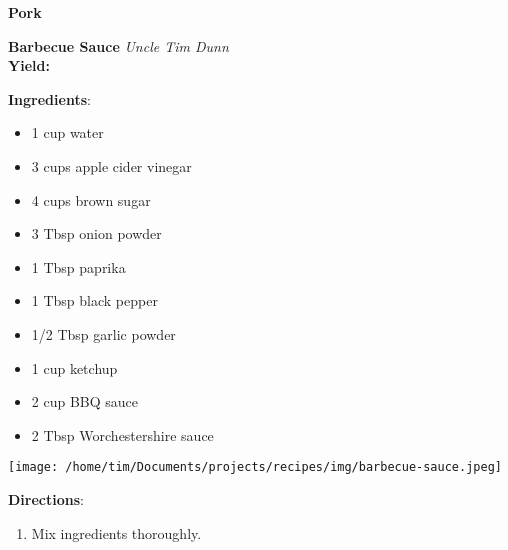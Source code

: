 \documentclass[11pt, twoside, openany]{book}
\begin{document}
{\newpage \LARGE \textbf{Pork}} \label{pork}\\
\noindent\begin{minipage}[t]{\linewidth}%
{\Large\textbf{Barbecue Sauce}} \label{barbecue-sauce}\hfill\textit{Uncle Tim Dunn}\\
\textbf{Yield:} \textit{}\\
\noindent\begin{minipage}[t]{0.78\linewidth}%
\textbf{Ingredients}:\vspace{-3mm}
\begin{multicols}{2}
\begin{itemize}\setlength\itemsep{-1mm}
\item 1 cup water
\item 3 cups apple cider vinegar
\item 4 cups brown sugar
\item 3 Tbsp onion powder
\item 1 Tbsp paprika
\item 1 Tbsp black pepper
\item 1/2 Tbsp garlic powder
\item 1 cup ketchup
\item 2 cup BBQ sauce
\item 2 Tbsp Worchestershire sauce
\end{itemize}
\end{multicols}
\end{minipage}
\noindent\begin{minipage}[t]{0.18\linewidth}
\centering \strut\vspace*{-\baselineskip}\newline
\texttt{[image: /home/tim/Documents/projects/recipes/img/barbecue-sauce.jpeg]}\\
\end{minipage}\vspace{3mm}
\textbf{Directions}:
\vspace{-3mm}\begin{enumerate}\setlength\itemsep{-1mm}
\item Mix ingredients thoroughly.
\end{enumerate}
\end{minipage}\vspace{8mm}
\end{document}
